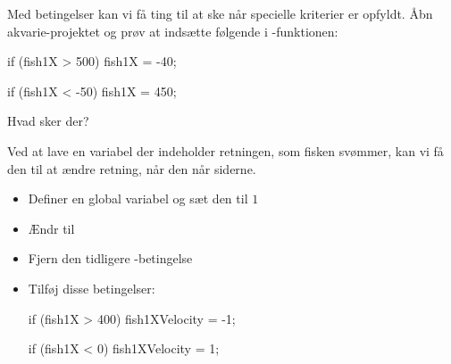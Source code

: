 \documentclass{ucph-handout}
\newcounter{handout}
\newcommand{\Ark}{Ark \#\arabic{handout} -- }
\begin{document}
\newpage
{}
\renewcommand{\Title}{\Ark Betingelser}%
\begin{exercisebox}[adjusted title=Eksperimentér]
Med betingelser kan vi få ting til at ske når specielle kriterier er
opfyldt. Åbn akvarie-projektet og prøv at indsætte følgende i
-funktionen:

\begin{javascript}
if (fish1X > 500) {
    fish1X = -40;
}
        
if (fish1X < -50) {
    fish1X = 450;
}
\end{javascript}

\noindent
Hvad sker der?
\end{exercisebox}

\begin{exercisebox}[adjusted title=Skifte retning]
Ved at lave en variabel der indeholder retningen, som fisken svømmer,
kan vi få den til at ændre retning, når den når siderne.

\begin{itemize}
\item Definer en global variabel  og sæt den til $1$
\item Ændr  til 
\item Fjern den tidligere -betingelse
\item Tilføj disse betingelser:

\begin{javascript}
if (fish1X > 400) {
    fish1XVelocity = -1;
}
  
if (fish1X < 0) {
    fish1XVelocity = 1;
}
\end{javascript}

\end{itemize}
\end{exercisebox}
\end{document}
